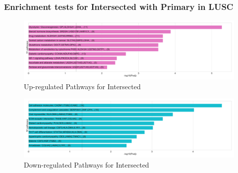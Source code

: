 \documentclass{beamer}
\begin{document}
    \begin{frame}
        \frametitle{Enrichment tests for Intersected with Primary in LUSC}

        \begin{figure}
            \includegraphics[width=0.8 \linewidth]{figures/DEG/Enrichment/STAR.FPKM.SQC-Primary.Both.Up.KEGG.pdf}
            \caption{Up-regulated Pathways for Intersected}
        \end{figure}

        \begin{figure}
            \includegraphics[width=0.8 \linewidth]{figures/DEG/Enrichment/STAR.FPKM.SQC-Primary.Both.Down.KEGG.pdf}
            \caption{Down-regulated Pathways for Intersected}
        \end{figure}
    \end{frame}
\end{document}
